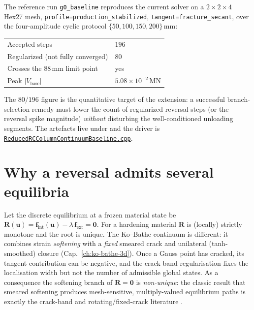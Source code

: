 The reference run \texttt{g0\_baseline} reproduces the current solver on
a \(2\times2\times4\) Hex27 mesh, \texttt{profile=production\_stabilized},
\texttt{tangent=fracture\_secant}, over the four-amplitude cyclic
protocol \(\{50,100,150,200\}\,\mathrm{mm}\):
%
\begin{center}
\begin{tabular}{@{}ll@{}}
\toprule
Accepted steps            & \(196\) \\
Regularized (not fully converged) & \(80\) \\
Crosses the \(88\,\mathrm{mm}\) limit point & yes \\
Peak \(|V_\text{base}|\)  & \(5.08\times10^{-2}\,\mathrm{MN}\) \\
\bottomrule
\end{tabular}
\end{center}
%
The \(80/196\) figure is the quantitative target of the extension: a
successful branch-selection remedy must lower the count of regularized
reversal steps (or the reversal spike magnitude) \emph{without}
disturbing the well-conditioned unloading segments. The artefacts live
under  and the driver is
\href{run:src/validation/ReducedRCColumnContinuumBaseline.cpp}{%
\texttt{ReducedRCColumnContinuumBaseline.cpp}}.

\section{Why a reversal admits several equilibria}

Let the discrete equilibrium at a frozen material state be
\(\mathbf{R}(\mathbf{u})=\mathbf{f}_\text{int}(\mathbf{u})
-\lambda\,\mathbf{f}_\text{ext}=\mathbf{0}\). For a hardening material
\(\mathbf{R}\) is (locally) strictly monotone and the root is unique. The
Ko--Bathe continuum is different: it combines strain \emph{softening}
with a \emph{fixed} smeared crack and unilateral (tanh-smoothed) closure
(Cap.~\ref{ch:ko-bathe-3d}). Once a Gauss point has cracked, its
tangent contribution can be negative, and the crack-band regularisation
fixes the localisation width but not the number of admissible global
states. As a consequence the softening branch of \(\mathbf{R}=\mathbf{0}\)
is \emph{non-unique}: the classic result that smeared softening produces
mesh-sensitive, multiply-valued equilibrium paths is exactly the
crack-band and rotating/fixed-crack literature
\cite{BazantOh1983CrackBand,RotsBlaauwendraad1989CrackModels}.

